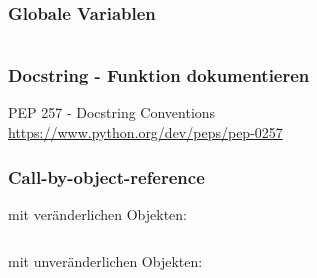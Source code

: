 \begin{minipage}[t]{0.49\textwidth}
	\subsubsection{Globale Variablen}
	
\end{minipage}
\begin{minipage}[t]{0.02\textwidth} $ \quad $\end{minipage}
\begin{minipage}[t]{0.49\textwidth}
	\subsubsection{Docstring - Funktion dokumentieren}
	PEP 257 - Docstring Conventions\\
	\url{https://www.python.org/dev/peps/pep-0257}
		
\end{minipage}

\subsubsection{Call-by-object-reference}
\begin{minipage}[t]{0.49\textwidth}
	mit veränderlichen Objekten:
	
\end{minipage}
\begin{minipage}[t]{0.02\textwidth} $ \quad $\end{minipage}
\begin{minipage}[t]{0.49\textwidth}
	mit unveränderlichen Objekten:
	
\end{minipage}



